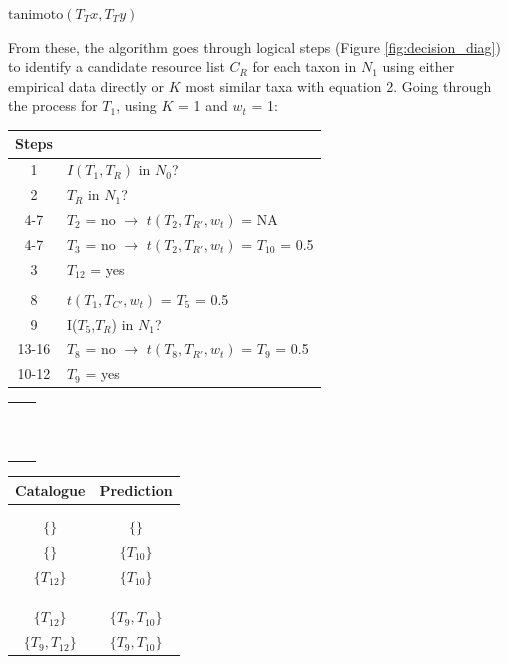     \centerline{$\mbox{tanimoto}(T_Tx, T_Ty)$}
\bigskip

From these, the algorithm goes through logical steps (Figure \ref{fig:decision_diag}) to identify a candidate resource list $C_R$ for each taxon in $N_1$ using either empirical data directly or $K$ most similar taxa with equation 2. Going through the process for $T_1$, using $K$ = 1 and $w_t$ = 1:
\bigskip

\begin{table}[h!]
  \centering
  \small
  \begin{tabular}{cl}
      Steps \\
      \hline
      1        &$I(T_1,T_R)$ in $N_0$? \\
      2        &$T_R$ in $N_1$? \\
      4-7      &$T_2$ = no $\rightarrow$ $t(T_2, T_{R'}, w_t)$ = NA   \\
      4-7      &$T_3$ = no $\rightarrow$ $t(T_2, T_{R'}, w_t)$ = $T_{10}$ = 0.5 \\
      3        &$T_{12}$ = yes    \\  \\
      8        &$t(T_1, T_{C'}, w_t)$ = $T_5$ = 0.5            \\
      9        &I($T_5$,$T_R$) in $N_1$? \\
      13-16    &$T_8$ = no $\rightarrow$ $t(T_8, T_{R'}, w_t)$ = $T_9$ = 0.5  \\
      10-12    &$T_9$ = yes   \\
  \end{tabular}
  \begin{tabular}{c|c}
     & \\  \\  \\  \\  \\  \\  \\  \\  \\  \\  \\
  \end{tabular}
  \begin{tabular}{cc}
      Catalogue   & Prediction \\
      \hline \\ \\
      $\{\}$    & $\{\}$            \\
      $\{\}$    & $\{T_{10}\}$      \\
      $\{T_{12}\}$    & $\{T_{10}\}$      \\  \\  \\ \\
      $\{T_{12}\}$    & $\{T_9, T_{10}\}$      \\
      $\{T_9, T_{12}\}$    & $\{T_9, T_{10}\}$      \\
  \end{tabular}
\end{table}
\bigskip

